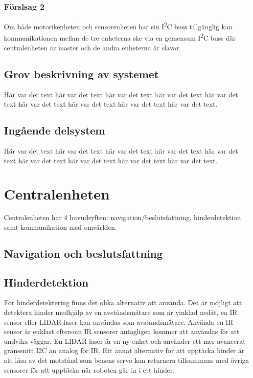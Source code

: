 \documentclass[a4paper,titlepage,12pt]{article}
\newcommand{\itc}{I\textsuperscript{2}C}
\begin{document}
	\subsubsection{Förslsag 2}
	Om både motorikenheten och sensorenheten har sin \itc{} buss tillgänglig kan 
	kommunikationen mellan de tre enheterna ske via en gemensam \itc{} buss där
	centralenheten är master och de andra enheterna är slavar. 
	
	
	
	\subsection{Grov beskrivning av systemet}
	Här var det text här var det text här var det text
	här var det text här var det text här var det text
	här var det text här var det text här var det text.
	
	
	\subsection{Ingående delsystem}
	Här var det text här var det text här var det text
	här var det text här var det text här var det text
	här var det text här var det text här var det text.
	
	
	\section{Centralenheten}
	Centralenheten har 4 huvudsyften: navigation/beslutsfattning, hinderdetektion samt
	kommunikation med omvärlden.

	\subsection{Navigation och beslutsfattning}

	\subsection{Hinderdetektion}
	För hinderdetektering finns det olika alternativ att använda. Det är möjligt att 
	detektera hinder medhjälp av en avståndsmätare som är vinklad nedåt, en IR sensor 
	eller LIDAR laser kan användas som avståndsmätare. Använda en IR sensor är enklast 
	eftersom IR sensorer antagligen kommer att användas för att undvika väggar. En 
	LIDAR laser är en ny enhet och använder ett mer avancerat gränssnitt I2C än 
	analog för IR. Ett annat alternativ för att upptäcka hinder är att läsa av det 
	motstånd som benens servo kan returnera tillsammans med övriga sensorer för 
	att upptäcka när roboten går in i ett hinder. 
\end{document}
